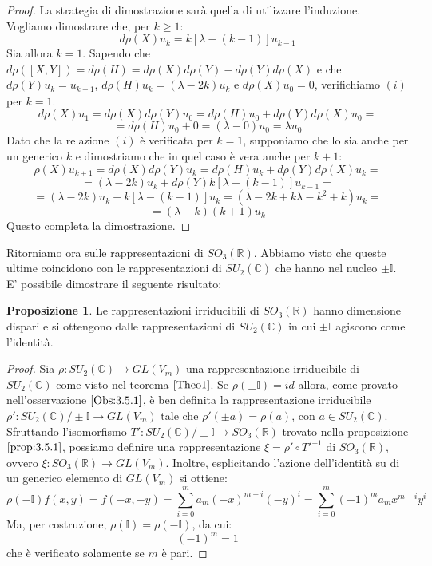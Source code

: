 \documentclass[12pt,a4paper]{report}
\theoremstyle{definition}
\theoremstyle{Theorem}
\newtheorem{Prop}[Def]{Proposizione}
\theoremstyle{definition}
\theoremstyle{definition}
\theoremstyle{definition}
\begin{document}
\begin{proof}
	La strategia di dimostrazione sarà quella di utilizzare l'induzione.
	Vogliamo dimostrare che, per $k\geq 1$:
	\begin{equation}
		\label{eq:4}
		d\rho(X)u_k=k[\lambda-(k-1)]u_{k-1} 
\tag{i}
\end{equation}
	Sia allora $k=1$. Sapendo che $d\rho([X,Y])=d\rho(H)=d\rho(X)d\rho(Y)-d\rho(Y)d\rho(X)$ e che $d\rho(Y)u_k=u_{k+1}$, $d\rho(H)u_k=(\lambda-2k)u_k$ e $d\rho(X)u_0=0$, verifichiamo $(i)$ per $k=1$.
	$$d\rho(X)u_1=d\rho(X)d\rho(Y)u_0=d\rho(H)u_0+d\rho(Y)d\rho(X)u_0=$$$$=d\rho(H)u_0+0=(\lambda-0)u_0=\lambda u_0$$
	Dato che la relazione $(i)$ è verificata per $k=1$, supponiamo che lo sia anche per un generico $k$ e dimostriamo che in quel caso è vera anche per $k+1$:
	$$\rho(X)u_{k+1}=d\rho(X)d\rho(Y)u_{k}=d\rho(H)u_k+d\rho(Y)d\rho(X)u_k=$$
	$$=(\lambda-2k)u_k+d\rho(Y)k[\lambda-(k-1)]u_{k-1}=$$ 
	$$=(\lambda-2k)u_k+k[\lambda-(k-1)]u_{k}=(\lambda-2k+k\lambda-k^2+k)u_k=$$
	$$=(\lambda-k)(k+1)u_k$$
	Questo completa la dimostrazione.
\end{proof}
Ritorniamo ora sulle rappresentazioni di $SO_3(\mathbb{R})$. Abbiamo visto che queste ultime coincidono con le rappresentazioni di $SU_2(\mathbb{C})$ che hanno nel nucleo $\pm\mathbb{I}$. E' possibile dimostrare il seguente risultato:
\begin{Prop}
	Le rappresentazioni irriducibili di $SO_3(\mathbb{R})$ hanno dimensione dispari e si ottengono dalle rappresentazioni di $SU_2(\mathbb{C})$ in cui $\pm\mathbb{I}$ agiscono come l'identità.
\end{Prop}
\begin{proof}
	Sia $\rho:SU_2(\mathbb{C})\rightarrow GL(V_m)$ una rappresentazione irriducibile di $SU_2(\mathbb{C})$ come visto nel teorema $\ref{Theo1}$. Se $\rho(\pm\mathbb{I})=id$ allora, come provato nell'osservazione $\ref{Obs:3.5.1}$, è ben definita la rappresentazione irriducibile $\rho':SU_2(\mathbb{C})/\pm\mathbb{I}\rightarrow GL(V_m)$ tale che $\rho'(\pm a)=\rho(a)$, con $a\in SU_2(\mathbb{C})$. Sfruttando l'isomorfismo $T':SU_2(\mathbb{C})/\pm\mathbb{I}\rightarrow SO_3(\mathbb{R})$ trovato nella proposizione $\ref{prop:3.5.1}$, possiamo definire una rappresentazione $\xi=\rho'\circ T'^{-1}$ di $SO_3(\mathbb{R})$, ovvero $\xi:SO_3(\mathbb{R})\rightarrow GL(V_m)$.
	Inoltre, esplicitando l'azione dell'identità su di un generico elemento di $GL(V_m)$ si ottiene: $$\rho(-\mathbb{I})f(x,y)=f(-x,-y)=\sum_{i=0}^{m}a_m(-x)^{m-i}(-y)^i=\sum_{i=0}^{m}(-1)^ma_mx^{m-i}y^i$$
	Ma, per costruzione, $\rho(\mathbb{I})=\rho(-\mathbb{I})$, da cui:
	$$(-1)^m=1$$
	che è verificato solamente se $m$ è pari.
\end{proof}
\end{document}
